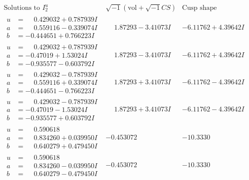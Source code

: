 \documentclass[1p]{elsarticle_modified}
\theoremstyle{definition}
\newcommand{\I}{\sqrt{-1}}
\begin{document}
$$\begin{array}{c|c|c}  
\text{Solutions to }I^u_{2}& \I (\text{vol} + \sqrt{-1}CS) & \text{Cusp shape}\\
 \hline 
\begin{aligned}
u &= \phantom{-}0.429032 + 0.787939 I \\
a &= \phantom{-}0.559116 - 0.339074 I \\
b &= -0.444651 + 0.766223 I\end{aligned}
 & \phantom{-}1.87293 - 3.41073 I & -6.11762 + 4.39642 I \\ \hline\begin{aligned}
u &= \phantom{-}0.429032 + 0.787939 I \\
a &= -0.47019 + 1.53024 I \\
b &= -0.935577 - 0.603792 I\end{aligned}
 & \phantom{-}1.87293 - 3.41073 I & -6.11762 + 4.39642 I \\ \hline\begin{aligned}
u &= \phantom{-}0.429032 - 0.787939 I \\
a &= \phantom{-}0.559116 + 0.339074 I \\
b &= -0.444651 - 0.766223 I\end{aligned}
 & \phantom{-}1.87293 + 3.41073 I & -6.11762 - 4.39642 I \\ \hline\begin{aligned}
u &= \phantom{-}0.429032 - 0.787939 I \\
a &= -0.47019 - 1.53024 I \\
b &= -0.935577 + 0.603792 I\end{aligned}
 & \phantom{-}1.87293 + 3.41073 I & -6.11762 - 4.39642 I \\ \hline\begin{aligned}
u &= \phantom{-}0.590618\phantom{ +0.000000I} \\
a &= \phantom{-}0.834260 + 0.039950 I \\
b &= \phantom{-}0.640279 + 0.479450 I\end{aligned}
 & -0.453072\phantom{ +0.000000I} & -10.3330\phantom{ +0.000000I} \\ \hline\begin{aligned}
u &= \phantom{-}0.590618\phantom{ +0.000000I} \\
a &= \phantom{-}0.834260 - 0.039950 I \\
b &= \phantom{-}0.640279 - 0.479450 I\end{aligned}
 & -0.453072\phantom{ +0.000000I} & -10.3330\phantom{ +0.000000I} \\ \hline\begin{aligned}

\end{aligned}
\end{array}$$
\end{document}
